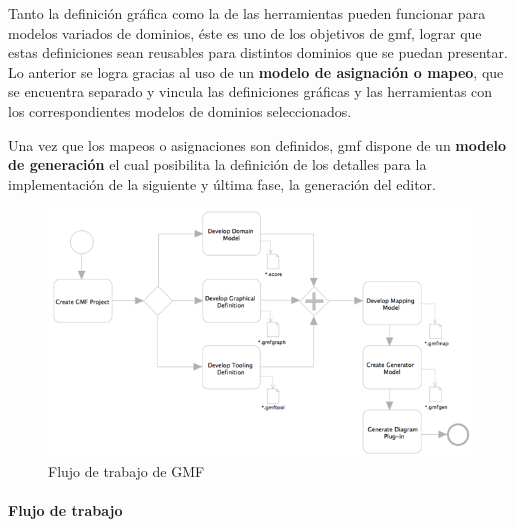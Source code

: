 \documentclass[a4paper,12pt,oneside,spanish]{book}
\begin{document}
Tanto la definición gráfica como la de las herramientas pueden funcionar para modelos variados de dominios, éste es uno de los objetivos de \gls{gmf}, lograr que estas definiciones sean reusables para distintos dominios que se puedan presentar. Lo anterior se logra gracias al uso de un \textbf{modelo de asignación o mapeo}, que se encuentra separado y vincula las definiciones gráficas y las herramientas con los correspondientes modelos de dominios seleccionados.

Una vez que los mapeos o asignaciones son definidos, \gls{gmf} dispone de un \textbf{modelo de generación} el cual posibilita la definición de los detalles para la implementación de la siguiente y última fase, la generación del editor.


\begin{figure}[hbtp]
\centering
\includegraphics[scale=.67]{./img/GMFWorkflow}
\caption{Flujo de trabajo de GMF}
\label{fig:GMFWorkflow}
\end{figure}


\paragraph{Flujo de trabajo}
\end{document}
